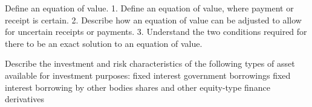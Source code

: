  
Define an equation of value.
1. Define an equation of value, where payment or receipt is certain.
2. Describe how an equation of value can be adjusted to allow for uncertain receipts or payments.
3. Understand the two conditions required for there to be an exact solution to an equation of value.



Describe the investment and risk characteristics of the following types of asset available for investment purposes: fixed interest government borrowings fixed interest borrowing by other bodies shares and other equity-type finance derivatives
